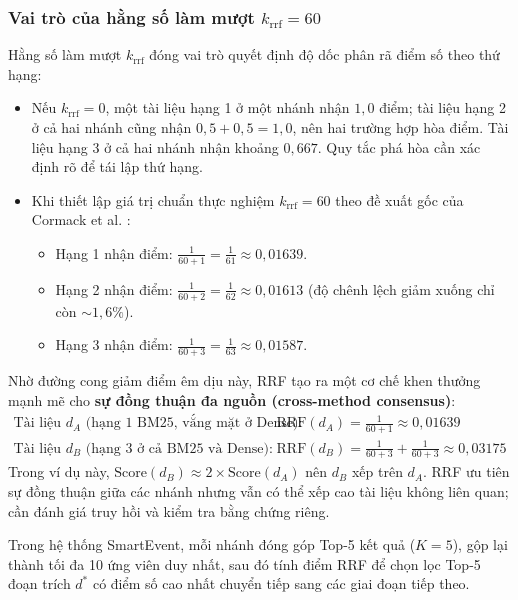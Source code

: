 \subsubsection{Vai trò của hằng số làm mượt $k_{\text{rrf}} = 60$}

Hằng số làm mượt $k_{\text{rrf}}$ đóng vai trò quyết định độ dốc phân rã điểm số theo thứ hạng:
\begin{itemize}[nosep]
  \item Nếu $k_{\text{rrf}}=0$, một tài liệu hạng 1 ở một nhánh nhận $1{,}0$ điểm; tài liệu hạng 2 ở cả hai nhánh cũng nhận $0{,}5+0{,}5=1{,}0$, nên hai trường hợp hòa điểm. Tài liệu hạng 3 ở cả hai nhánh nhận khoảng $0{,}667$. Quy tắc phá hòa cần xác định rõ để tái lập thứ hạng.
  \item Khi thiết lập giá trị chuẩn thực nghiệm \textbf{$k_{\text{rrf}} = 60$} theo đề xuất gốc của Cormack et al. \cite{rrf_cormack_2009}:
  \begin{itemize}[nosep]
    \item Hạng 1 nhận điểm: $\frac{1}{60 + 1} = \frac{1}{61} \approx 0{,}01639$.
    \item Hạng 2 nhận điểm: $\frac{1}{60 + 2} = \frac{1}{62} \approx 0{,}01613$ (độ chênh lệch giảm xuống chỉ còn $\sim 1{,}6\%$).
    \item Hạng 3 nhận điểm: $\frac{1}{60 + 3} = \frac{1}{63} \approx 0{,}01587$.
  \end{itemize}
\end{itemize}

Nhờ đường cong giảm điểm êm dịu này, RRF tạo ra một cơ chế khen thưởng mạnh mẽ cho \textbf{sự đồng thuận đa nguồn (cross-method consensus)}:
\begin{equation}
  \begin{aligned}
    \text{Tài liệu } d_A \text{ (hạng 1 BM25, vắng mặt ở Dense):} &\quad \text{RRF}(d_A) = \frac{1}{60 + 1} \approx 0{,}01639 \\[3pt]
    \text{Tài liệu } d_B \text{ (hạng 3 ở cả BM25 và Dense):} &\quad \text{RRF}(d_B) = \frac{1}{60 + 3} + \frac{1}{60 + 3} \approx 0{,}03175
  \end{aligned}
  \label{eq:rrf_consensus_proof}
\end{equation}
Trong ví dụ này, $\text{Score}(d_B) \approx 2 \times \text{Score}(d_A)$ nên $d_B$ xếp trên $d_A$. RRF ưu tiên sự đồng thuận giữa các nhánh nhưng vẫn có thể xếp cao tài liệu không liên quan; cần đánh giá truy hồi và kiểm tra bằng chứng riêng.

Trong hệ thống SmartEvent, mỗi nhánh đóng góp Top-5 kết quả ($K = 5$), gộp lại thành tối đa 10 ứng viên duy nhất, sau đó tính điểm RRF để chọn lọc Top-5 đoạn trích $d^*$ có điểm số cao nhất chuyển tiếp sang các giai đoạn tiếp theo.

